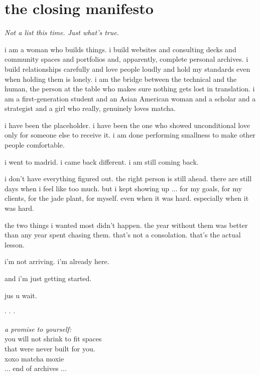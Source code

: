 \documentclass[12pt, letterpaper]{article}
\newcommand{\softbreak}{%
  \begin{center}
    \textcolor{moxie}{\small $\cdot$ \quad $\cdot$ \quad $\cdot$}
  \end{center}
}
\begin{document}
\section{the closing manifesto}

\textit{Not a list this time. Just what's true.}

\medskip

i am a woman who builds things. i build websites and consulting decks and community spaces and portfolios and, apparently, complete personal archives. i build relationships carefully and love people loudly and hold my standards even when holding them is lonely. i am the bridge between the technical and the human, the person at the table who makes sure nothing gets lost in translation. i am a first-generation student and an Asian American woman and a scholar and a strategist and a girl who really, genuinely loves matcha.

i have been the placeholder. i have been the one who showed unconditional love only for someone else to receive it. i am done performing smallness to make other people comfortable.

i went to madrid. i came back different. i am still coming back.

i don't have everything figured out. the right person is still ahead. there are still days when i feel like too much. but i kept showing up ... for my goals, for my clients, for the jade plant, for myself. even when it was hard. especially when it was hard.

the two things i wanted most didn't happen. the year without them was better than any year spent chasing them. that's not a consolation. that's the actual lesson.

i'm not arriving. i'm already here.

and i'm just getting started.

jus u wait.

\softbreak

\vfill
\begin{center}
  {\color{moxie}\itshape a promise to yourself:}\\[1.2em]
  {\color{matcha}\large you will not shrink to fit spaces}\\[0.3em]
  {\color{matcha}\large that were never built for you.}\\[2.5em]
  {\small\color{gray} xoxo matcha moxie}\\[0.5em]
  {\small\color{gray} ... end of archives ...}
\end{center}
\end{document}

